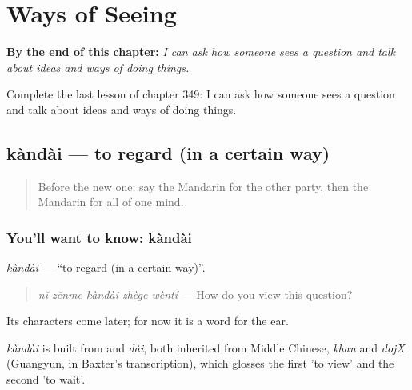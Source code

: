 
\chapter{Ways of Seeing}
\label{ch:zh-ways-of-seeing}

\begin{chapteropening}
\textbf{By the end of this chapter:} \emph{I can ask how someone sees a question and talk about ideas and ways of doing things.}

Complete the last lesson of chapter 349: I can ask how someone sees a question and talk about ideas and ways of doing things.
\end{chapteropening}

\section[kàndài]{kàndài — to regard (in a certain way)}

\label{lesson:ZH-C349-kandai}



\begin{quote}
Before the new one: say the Mandarin for the other party, then the Mandarin for all of one mind.
\end{quote}

\subsection*{You'll want to know: kàndài}
\emph{kàndài} — \textquotedblleft{}to regard (in a certain way)\textquotedblright{}.

\begin{quote}
\emph{nǐ zěnme kàndài zhège wèntí} — How do you view this question?
\end{quote}

Its characters come later; for now it is a word for the ear.

\begin{cousinweb}
\emph{kàndài} is built from  and \emph{dài}, both inherited from Middle Chinese, \emph{khan} and \emph{dojX} (Guangyun, in Baxter's transcription), which glosses the first 'to view' and the second 'to wait'.
\end{cousinweb}

